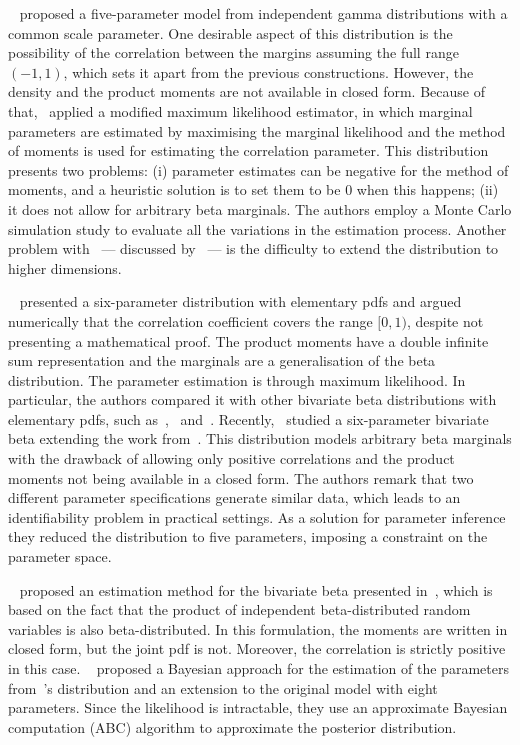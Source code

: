 \documentclass[a4paper, notitlepage, 10pt]{article}
\theoremstyle{definition}
\begin{document}
~\cite{arnold2011flexible} proposed a five-parameter model from independent gamma distributions with a common scale parameter. 
One desirable aspect of this distribution is the possibility of the correlation between the margins assuming the full range $(-1,1)$, which sets it apart from the previous constructions.
However, the density and the product moments are not available in closed form.
Because of that,~\cite{arnold2011flexible} applied a modified maximum likelihood estimator, in which marginal parameters are estimated by maximising the marginal likelihood and the method of moments is used for estimating the correlation parameter.
This distribution presents two problems: (i) parameter estimates can be negative for the method of moments, and a heuristic solution is to set them to be $0$ when this happens; (ii) it does not allow for arbitrary beta marginals.
The authors employ a Monte Carlo simulation study to evaluate all the variations in the estimation process.
Another problem with~\cite{arnold2011flexible} --- discussed by~\cite{olkin2015constructions} --- is the difficulty to extend the distribution to higher dimensions.  

~\cite{nadarajah_new_2017} presented a six-parameter distribution with elementary pdfs and argued numerically that the correlation coefficient covers the range $[0,1)$, despite not presenting a mathematical proof.
The product moments have a double infinite sum representation and the marginals are a generalisation of the beta distribution.
The parameter estimation is through maximum likelihood.
In particular, the authors compared it with other bivariate beta distributions with elementary pdfs, such as~\cite{libby1982multivariate},~\cite{sarabia2006bivariate} and~\cite{nadarajah2007new}. 
Recently,~\cite{trick2021bivariate} studied a six-parameter bivariate beta extending the work from~\cite{magnussen2004algorithm}.
This distribution models arbitrary beta marginals with the drawback of allowing only positive correlations and the product moments not being available in a closed form.
The authors remark that two different parameter specifications generate similar data, which leads to an identifiability problem in practical settings.
As a solution for parameter inference they reduced the distribution to five parameters, imposing a constraint on the parameter space.    

~\cite{barros2015estimaccao} proposed an estimation method for the bivariate beta presented in~\cite{nadarajah2005some}, which is based on the fact that the product of independent beta-distributed random variables is also beta-distributed.
In this formulation, the moments are written in closed form, but the joint  pdf is not. 
Moreover, the correlation is strictly positive in this case.
~\cite{crackel2017bayesian} proposed a Bayesian approach for the estimation of the parameters from~\cite{arnold2011flexible}'s distribution and an extension to the original model with eight parameters.
Since the likelihood is intractable, they use an approximate Bayesian computation (ABC) algorithm to approximate the posterior distribution.
\end{document}
